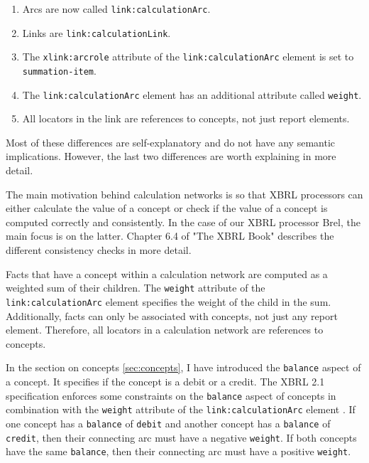 \begin{enumerate}
    \item Arcs are now called \texttt{link:calculationArc}.
    \item Links are \texttt{link:calculationLink}.
    \item The \texttt{xlink:arcrole} attribute of the \texttt{link:calculationArc} element is set to \texttt{summation-item}.
    \item The \texttt{link:calculationArc} element has an additional attribute called \texttt{weight}.
    \item All locators in the link are references to concepts, not just report elements.
\end{enumerate}

Most of these differences are self-explanatory and do not have any semantic implications.
However, the last two differences are worth explaining in more detail.

The main motivation behind calculation networks is so that XBRL processors can either calculate the value of a concept or check if the value of a concept is computed correctly and consistently.
In the case of our XBRL processor Brel, the main focus is on the latter. 
Chapter 6.4 of "The XBRL Book" \cite{fourny2023xbrl} describes the different consistency checks in more detail.

Facts that have a concept within a calculation network are computed as a weighted sum of their children.
The \texttt{weight} attribute of the \texttt{link:calculationArc} element specifies the weight of the child in the sum.
Additionally, facts can only be associated with concepts, not just any report element.
Therefore, all locators in a calculation network are references to concepts.

In the section on concepts \ref{sec:concepts}, I have introduced the \texttt{balance} aspect of a concept.
It specifies if the concept is a debit or a credit.
The XBRL 2.1 specification enforces some constraints on the \texttt{balance} aspect of concepts in combination with the \texttt{weight} attribute of the \texttt{link:calculationArc} element \cite{xbrl21_concept}.
If one concept has a \texttt{balance} of \texttt{debit} and another concept has a \texttt{balance} of \texttt{credit}, then their connecting arc must have a negative \texttt{weight}.
If both concepts have the same \texttt{balance}, then their connecting arc must have a positive \texttt{weight}.

